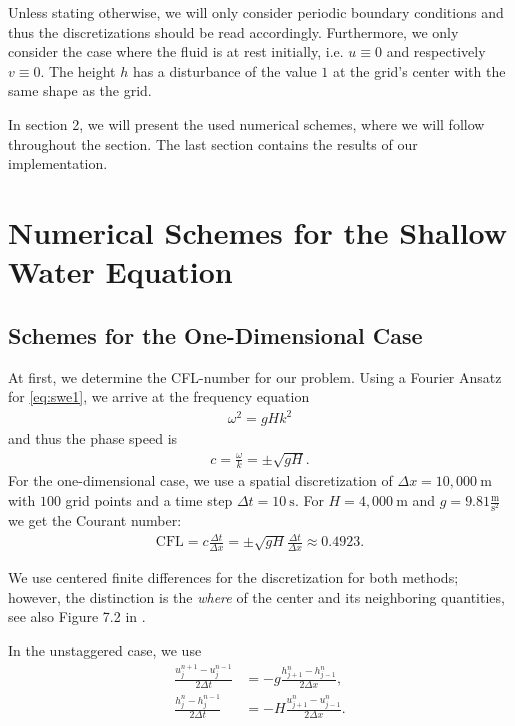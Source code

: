 Unless stating
otherwise, we will only consider periodic boundary conditions and thus the discretizations should
be read accordingly. Furthermore, we only consider the case where the fluid is at rest initially, i.e.
$u \equiv 0$ and respectively $v \equiv 0$. The height $h$ has a disturbance of the value $1$ at the grid's center with the same shape as the grid.

In section 2, we will present the used numerical schemes, where we will follow \cite{Doos2022}
throughout the section. The last section contains the results of our implementation.

\section{Numerical Schemes for the Shallow Water Equation}
\subsection{Schemes for the One-Dimensional Case}
At first, we determine the CFL-number for our problem. Using a Fourier Ansatz for \eqref{eq:swe1},
we arrive at the frequency equation
\begin{align*}
    \omega^2 = gHk^2
\end{align*}
and thus the phase speed is
\begin{align*}
    c = \frac{\omega}{k} = \pm \sqrt{gH}.
\end{align*}
For the one-dimensional case, we use a spatial discretization of $\Delta x= 10,000~\mathrm{m}$ with
$100$ grid points and a time step $\Delta t = 10~\mathrm{s}$. For $H = 4,000~\mathrm{m}$ and $g = 9.81
\tfrac{\mathrm{m}}{\mathrm{s}^2}$ we get the Courant number:
\begin{align*}
    \mathrm{CFL} = c \frac{\Delta t}{\Delta x} = \pm \sqrt{gH} \frac{\Delta t}{\Delta x} \approx 0.4923.
\end{align*}

We use centered finite differences for the discretization for both methods; however, the distinction
is the \emph{where} of the center and its neighboring quantities, see also Figure 7.2 in 
\cite{Doos2022}. 

In the unstaggered case, we use
\begin{align*}
    \frac{u^{n+1}_j - u^{n-1}_j}{2 \Delta t} &= -g \frac{h_{j+1}^n - h_{j-1}^n}{2 \Delta x}, \\[1em]
    \frac{h_{j}^n - h^{n-1}_{j}}{2\Delta t} &= -H \frac{u^n_{j+1} - u^n_{j-1}}{2 \Delta x}.
\end{align*}

